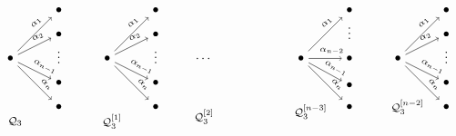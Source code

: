 \documentclass[smallextended,envcountsect,envcountsame]{svjour3}
\numberwithin{equation}{section}
\begin{document}
\[
\begin{tikzpicture}[scale=1.34]
  \draw (0,0) node (I1) {$\bullet$} +(1,1) node (J11) {$\bullet$} +(1,.5) node (J12) {$\bullet$} +(1,0.1) node (D1) { $\vdots$}+(1,-.5) node (J1N1) {$\bullet$} +(1,-1) node (J1N) {$\bullet$} +(0.1,-1.3) node {\footnotesize$\mathcal Q_3$}; 
  \draw[->] (I1)--(J11) node[pos=.7,above,sloped]{\scriptsize$\alpha_1$};
  \draw[->] (I1)--(J12) node[pos=.7,above,sloped]{\scriptsize$\alpha_2$};
  \draw[->] (I1)--(J1N1) node[pos=.7,above,sloped]{\scriptsize$\alpha_{n-1}$};
  \draw[->] (I1)--(J1N) node[pos=.7,above,sloped]{\scriptsize$\alpha_{n}$};

  \draw (2,0) node (I2) {$\bullet$} +(1,1) node (J21) {$\bullet$} +(1,.5) node (J22) {$\bullet$}+(1,0.1) node (D2) { $\vdots$} +(1,-.5) node (J2N1) {$\bullet$} +(1,-1) node (J2N) {$\bullet$} +(0.1,-1.3) node (P1) {\footnotesize$\mathcal Q_3^{[1]}$} ; 
  \draw[->] (I2)--(J21) node[pos=.7,above,sloped]{\scriptsize$\alpha_1$};
  \draw[->] (I2)--(J22) node[pos=.7,above,sloped]{\scriptsize$\alpha_2$};
  \draw[->] (I2)--(J2N1) node[pos=.7,above,sloped]{\scriptsize$\alpha_{n-1}$};
  \draw[->] (I2)--(J2N) node[pos=.7,above,sloped]{\scriptsize$\alpha_{n}$};

  \draw (4,0) node (DOTS) {$\dots$}+(0,-1.2) node (P2b) {\footnotesize$\mathcal Q_3^{[2]}$};

  \draw (6,0) node (I3) {$\bullet$} +(1,1) node (J31) {$\bullet$}   +(1,.6) node (D31) { $\vdots$} +(1,0) node (J3N2) {$\bullet$} +(1,-.55) node (J3N1) { $\bullet$} +(1,-1) node (J3N) {$\bullet$} +(0.2,-1.1) node (P3) {\footnotesize$\mathcal Q_3^{[n-3]}$} ; 
  \draw[->] (I3)--(J31) node[pos=.7,above,sloped]{\scriptsize$\alpha_1$};
  \draw[->] (I3)--(J3N2) node[pos=.7,above,sloped]{\scriptsize$\alpha_{n-2}$};
  \draw[->] (I3)--(J3N1) node[pos=.7,above,sloped]{\scriptsize$\alpha_{n-1}$};
  \draw[->] (I3)--(J3N) node[pos=.7,above,sloped]{\scriptsize$\alpha_{n}$};

  \draw (8,0) node (I4) {$\bullet$} +(1,1) node (J41) {$\bullet$} +(1,.5) node (J42) {$\bullet$} +(1,0.1) node (D4) { $\vdots$} +(1,-.5) node (J4N1) {$\bullet$} +(1,-1) node (J4N) {$\bullet$} +(0.2,-1) node (P4) {\footnotesize$\mathcal Q_3^{[n-2]}$}; 
  \draw[->] (I4)--(J41) node[pos=.7,above,sloped]{\scriptsize$\alpha_1$};
  \draw[->] (I4)--(J42) node[pos=.7,above,sloped]{\scriptsize$\alpha_2$};
  \draw[->] (I4)--(J4N1) node[pos=.7,above,sloped]{\scriptsize$\alpha_{n-1}$};
  \draw[->] (I4)--(J4N) node[pos=.7,above,sloped]{\scriptsize$\alpha_{n}$};


\end{tikzpicture}\]
\end{document}
